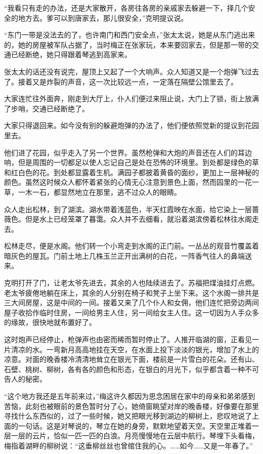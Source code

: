 \par “我看只有走的办法，还是大家散开，各房往各房的亲戚家去躲避一下，择几个安全的地方去。爹可以到唐家去，那儿很安全，”克明提议说。
\par “东门一带是没法去的了，也许南门和西门安全点，”张太太说，她是从东门逃出来的，她的房屋被军队占据了，当时梅正在张家玩，本来要回家去，但是那一带的交通已经断绝，她只得跟着琴逃到高家来。
\par 张太太的话还没有说完，屋顶上又起了一个大响声。众人知道又是一个炮弹飞过去了。接着又是炸裂的声音，这一次比较远一点，一定落在隔壁公馆里去了。
\par 大家连忙往外面奔，刚走到大厅上，仆人们便过来阻止说，大门上了锁，街上放满了步哨，交通已经断绝了。
\par 大家只得退回来。如今没有别的躲避炮弹的办法了，他们便依照觉新的提议到花园里去。
\par 他们进了花园，似乎走入了另一个世界。虽然枪弹和大炮的声音还在人们的耳边响，但是周围的一切都足以使人忘记自己是处在恐怖的环境里。到处都是绿色的草和红白色的花。到处都显露着生机。满园子都披着黄昏的面纱，更加上一层神秘的颜色。虽然这时候众人都怀着紧张的心情无心注意到景色上面，然而园里的一花一草，一木一石，都显然地立在那里，逃不过众人的眼睛。
\par 众人走出松林，到了湖滨。湖水带着浅蓝色，半天红霞映在水面，给它染上一层蔷薇色。但是水上已经笼罩了暮霭。众人并不去细看，就沿着湖滨傍着松林往水阁走去。
\par 松林走尽，便是水阁。他们转一个小弯走到水阁的正门前。一丛丛的观音竹覆盖着暗灰色的屋瓦。门前土地上几株玉兰正开出满树的白花，一阵香气往人的鼻端送来。
\par 克明打开了门，让老太爷先进去，其余的人也陆续进去了。苏福把煤油挂灯点燃。老太爷疲倦地躺在\WangGua 床上，其余的人分别在椅子和凳子上坐下来。这个水阁一排共是三大间房屋，这是中间的一间。接着又来了几个仆人和女佣，他们连忙把旁边两间屋子收拾作临时住房，一间给男主人住，另一间给女主人住。这一切因为人手众多的缘故，很快地就布置好了。
\par 这时炮声已经停止，枪弹声也由密而稀而暂时停止了。人推开临湖的窗，正看见一片清凉的水。一弯新月高高地挂在天空，在水面上投下淡淡的银光，增加了水上的凉意。对面的晚香楼冷清清地耸立在银光下面，楼前是一片雪白的花朵。还有山、石壁、桃树、柳树，各有各的颜色和形态，在银白的月光下，似乎都含着一种不可告人的秘密。
\par “这个地方我还是五年前来过，”梅这许久都因为思念困居在家中的母亲和弟弟感到苦恼，此刻也被眼前的景色暂时分了心，她倚窗眺望对岸的晚香楼，好像要在那里寻找什么东西似的，过了一些时候，她又把眼光移到湖边的柳树上，悲叹地说了上面的一句话。这是对琴说的，琴立在她的身旁，默默地望着天空。天空里正堆着一层一层的云片，恰似一匹一匹的白浪。月亮慢慢地在云层中航行。琴埋下头看梅，梅指着湖畔的柳树说：“这垂柳丝丝也曾绾住我的心。……如今……又是一年春了。”
